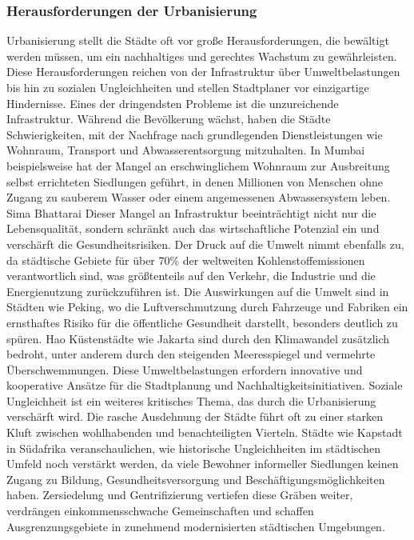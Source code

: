 \documentclass[conference,compsoc,final,a4paper, onecolumn, 11pt]{IEEEtran}
\begin{document}
\subsubsection{Herausforderungen der Urbanisierung}
Urbanisierung stellt die Städte oft vor große Herausforderungen, die bewältigt werden müssen, um ein nachhaltiges und gerechtes Wachstum zu gewährleisten. 
Diese Herausforderungen reichen von der Infrastruktur über Umweltbelastungen bis hin zu sozialen Ungleichheiten und stellen Stadtplaner vor einzigartige Hindernisse.
Eines der dringendsten Probleme ist die unzureichende Infrastruktur. 
Während die Bevölkerung wächst, haben die Städte Schwierigkeiten, mit der Nachfrage nach grundlegenden Dienstleistungen wie Wohnraum, Transport und Abwasserentsorgung mitzuhalten. \autocite[S. 13ff]{Zhang2015-vv}
In Mumbai beispielsweise hat der Mangel an erschwinglichem Wohnraum zur Ausbreitung selbst errichteten Siedlungen geführt, in denen Millionen von Menschen ohne Zugang zu sauberem Wasser oder einem angemessenen Abwassersystem leben. 
Sima Bhattarai Dieser Mangel an Infrastruktur beeinträchtigt nicht nur die Lebensqualität, sondern schränkt auch das wirtschaftliche Potenzial ein und verschärft die Gesundheitsrisiken.
Der Druck auf die Umwelt nimmt ebenfalls zu, da städtische Gebiete für über 70\% der weltweiten Kohlenstoffemissionen verantwortlich sind, was größtenteils auf den Verkehr, die Industrie und die Energienutzung zurückzuführen ist. \autocite[S. 192f]{Taubenbock2015-pj}
Die Auswirkungen auf die Umwelt sind in Städten wie Peking, wo die Luftverschmutzung durch Fahrzeuge und Fabriken ein ernsthaftes Risiko für die öffentliche Gesundheit darstellt, besonders deutlich zu spüren. 
Hao Küstenstädte wie Jakarta sind durch den Klimawandel zusätzlich bedroht, unter anderem durch den steigenden Meeresspiegel und vermehrte Überschwemmungen. 
Diese Umweltbelastungen erfordern innovative und kooperative Ansätze für die Stadtplanung und Nachhaltigkeitsinitiativen. \autocite{Owen-Burge2022-zx}
Soziale Ungleichheit ist ein weiteres kritisches Thema, das durch die Urbanisierung verschärft wird. 
Die rasche Ausdehnung der Städte führt oft zu einer starken Kluft zwischen wohlhabenden und benachteiligten Vierteln. 
Städte wie Kapstadt in Südafrika veranschaulichen, wie historische Ungleichheiten im städtischen Umfeld noch verstärkt werden, da viele Bewohner informeller Siedlungen keinen Zugang zu Bildung, Gesundheitsversorgung und Beschäftigungsmöglichkeiten haben. 
Zersiedelung und Gentrifizierung vertiefen diese Gräben weiter, verdrängen einkommensschwache Gemeinschaften und schaffen Ausgrenzungsgebiete in zunehmend modernisierten städtischen Umgebungen. \autocite{Turok2021-mg}
\end{document}
